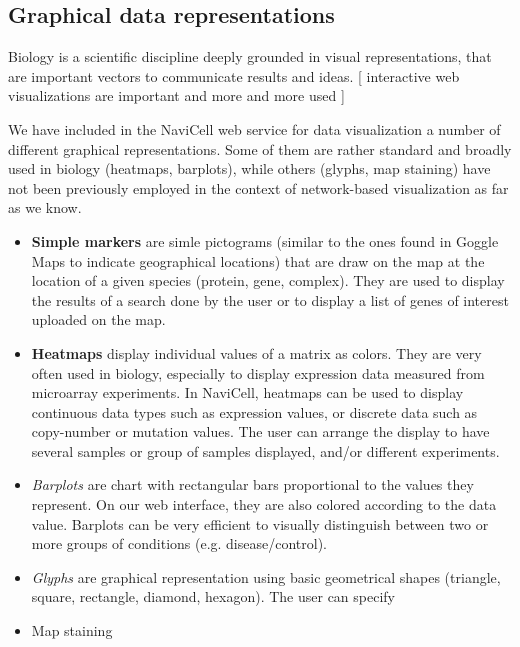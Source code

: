 \documentclass[a4,center,fleqn]{NAR}
\begin{document}
\subsection{Graphical data representations}

Biology is a scientific discipline deeply grounded in visual representations,
that are important vectors to communicate results and ideas. 
[ interactive web visualizations are important and more and more used ]

We have included in the NaviCell web service for data visualization a number of
different graphical representations. Some of them are rather standard
and broadly used in biology (heatmaps, barplots), while others (glyphs, map
staining) have not been previously employed in the context of network-based
visualization as far as we know. 

\begin{itemize}

\item \textbf{Simple markers} are simle pictograms (similar to the ones found in Goggle Maps
to indicate geographical locations) that are draw on the map at the location
of a given species (protein, gene, complex). They are used to display the
results of a search done by the user or to display a list of genes of interest
uploaded on the map.

\item \textbf{Heatmaps} display individual values of a matrix as
colors. They are very often used in biology, especially to display expression
data measured from microarray experiments. In NaviCell, heatmaps can be used to
display continuous data types such as expression values, or discrete data such
as copy-number or mutation values. The user can arrange the display to have
several samples or group of samples displayed, and/or different experiments. 

\item \emph{Barplots} are chart with rectangular bars proportional to the values
they represent. On our web interface, they are also colored according to the
data value. Barplots can be very efficient to visually distinguish between two
or more groups of conditions (e.g. disease/control).  

\item \emph{Glyphs} are graphical representation using basic geometrical shapes
(triangle, square, rectangle, diamond, hexagon). The user can specify  

\item Map staining 
\end{itemize}
\end{document}
